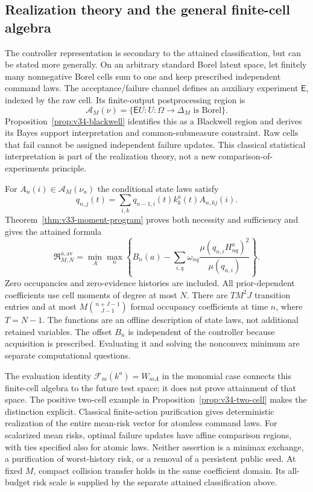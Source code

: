 \subsection{Realization theory and the general finite-cell algebra}
The controller representation is secondary to the attained classification,
but can be stated more generally. On an arbitrary standard Borel latent
space, let finitely many nonnegative Borel cells sum to one and keep
prescribed independent command laws. The acceptance/failure channel
defines an auxiliary experiment $\mathsf E$, indexed by the raw cell.
Its finite-output postprocessing region is
\[
              \mathscr A_M(\nu)=\{\mathsf E U:U:\Omega\to\Delta_M
                                      \text{ is Borel}\}.
\]
Proposition~\ref{prop:v34-blackwell} identifies this as a Blackwell
region and derives its Bayes support interpretation and common-submeasure
constraint. Raw cells that fail cannot be assigned independent failure
updates. This classical statistical interpretation is part of the
realization theory, not a new comparison-of-experiments principle.

For $A_n(i)\in\mathscr A_M(\nu_n)$ the conditional state laws satisfy
\[
 q_{n,j}(t)=\sum_{i,k}q_{n-1,i}(t)k_k^a(t)A_{n,kj}(i).
\]
Theorem~\ref{thm:v33-moment-program} proves both necessity and
sufficiency and gives the attained formula
\[
 \mathfrak R_{M,N}^{a,\mathrm{av}}
 =\min_A\max_n\left\{B_n(a)-
     \sum_{i,q}\omega_{nq}
       \frac{\mu(q_{n,i}H_{nq}^a)^2}{\mu(q_{n,i})}\right\}.
\]
Zero occupancies and zero-evidence histories are included. All
prior-dependent coefficients use cell moments of degree at most $N$.
There are $TM^2J$ transition entries and at most
$M\binom{n+J-1}{J-1}$ formal occupancy coefficients at time $n$,
where $T=N-1$. The functions are an offline description of state laws,
not additional retained variables. The offset $B_n$ is independent of
the controller because acquisition is prescribed. Evaluating it and
solving the nonconvex minimum are separate computational questions.

The evaluation identity $\mathcal F_m(k^a)=W_{mA}$ in the monomial
case connects this finite-cell algebra to the future test space; it
does not prove attainment of that space. The positive two-cell example
in Proposition~\ref{prop:v34-two-cell} makes the distinction explicit.
Classical finite-action purification \cite{DWW1951} gives deterministic
realization of the entire mean-risk vector for atomless command laws.
For scalarized mean risks, optimal failure updates have affine comparison
regions, with ties specified also for atomic laws. Neither assertion
is a minimax exchange, a purification of worst-history risk, or a
removal of a persistent public seed. At fixed $M$, compact collision
transfer holds in the same coefficient domain. Its all-budget risk
scale is supplied by the separate attained classification above.

